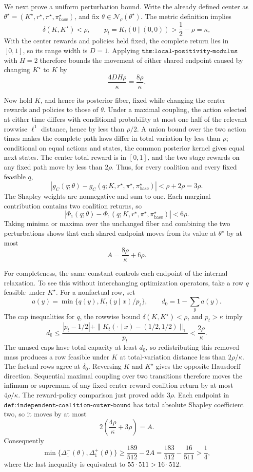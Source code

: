 We next prove a uniform perturbation bound.  Write the already defined center as \(\theta^\star=(K^\star,r^\star,\pi^\star,\pi_{\mathrm{base}}^\star)\), and fix \(\theta\in\mathcal N_\rho(\theta^\star)\).  The metric definition implies
\[
 \delta(K,K^\star)<\rho,
 \qquad
 p_t=K_t(0\mid(0,0))>\frac12-\rho=\kappa,
\]
With the center rewards and policies held fixed, the complete return lies in \([0,1]\), so its range width is \(D=1\).  Applying \(\texttt{thm:local-positivity-modulus}\) with \(H=2\) therefore bounds the movement of either shared endpoint caused by changing \(K^\star\) to \(K\) by
\[
 \frac{4DH\rho}{\kappa}=\frac{8\rho}{\kappa}.
\]

Now hold \(K\), and hence its posterior fiber, fixed while changing the center rewards and policies to those of \(\theta\).  Under a maximal coupling, the action selected at either time differs with conditional probability at most one half of the relevant rowwise \(\ell^1\) distance, hence by less than \(\rho/2\).  A union bound over the two action times makes the complete path laws differ in total variation by less than \(\rho\); conditional on equal actions and states, the common posterior kernel gives equal next states.  The center total reward is in \([0,1]\), and the two stage rewards on any fixed path move by less than \(2\rho\).  Thus, for every coalition and every fixed feasible \(q\),
\[
 |g_C(q;\theta)-g_C(q;K,r^\star,\pi^\star,\pi_{\mathrm{base}}^\star)|
 <\rho+2\rho=3\rho.
\]
The Shapley weights are nonnegative and sum to one.  Each marginal contribution contains two coalition returns, so
\[
 |\Phi_1(q;\theta)-\Phi_1(q;K,r^\star,\pi^\star,\pi_{\mathrm{base}}^\star)|<6\rho.
\]
Taking minima or maxima over the unchanged fiber and combining the two perturbations shows that each shared endpoint moves from its value at \(\theta^\star\) by at most
\[
 A=\frac{8\rho}{\kappa}+6\rho.
\]

For completeness, the same constant controls each endpoint of the internal relaxation.  To see this without interchanging optimization operators, take a row \(q\) feasible under \(K^\star\).  For a nonfactual row, set
\[
 a(y)=\min\{q(y),K_t(y\mid x)/p_t\},
 \qquad d_0=1-\sum_y a(y).
\]
The cap inequalities for \(q\), the rowwise bound \(\delta(K,K^\star)<\rho\), and \(p_t>\kappa\) imply
\[
 d_0
 \le \frac{|p_t-1/2|+
 \|K_t(\cdot\mid x)-(1/2,1/2)\|_1}{p_t}
 <\frac{2\rho}{\kappa}.
\]
The unused caps have total capacity at least \(d_0\), so redistributing this removed mass produces a row feasible under \(K\) at total-variation distance less than \(2\rho/\kappa\).  The factual rows agree at \(\delta_0\).  Reversing \(K\) and \(K^\star\) gives the opposite Hausdorff direction.  Sequential maximal coupling over two transitions therefore moves the infimum or supremum of any fixed center-reward coalition return by at most \(4\rho/\kappa\).  The reward-policy comparison just proved adds \(3\rho\).  Each endpoint in \(\texttt{def:independent-coalition-outer-bound}\) has total absolute Shapley coefficient two, so it moves by at most
\[
 2\left(\frac{4\rho}{\kappa}+3\rho\right)=A.
\]
Consequently
\[
 \min\{\Delta_1^-(\theta),\Delta_1^+(\theta)\}
 \ge \frac{189}{512}-2A
 =\frac{183}{512}-\frac{16}{511}
 >\frac14,
\]
where the last inequality is equivalent to \(55\cdot511>16\cdot512\).

